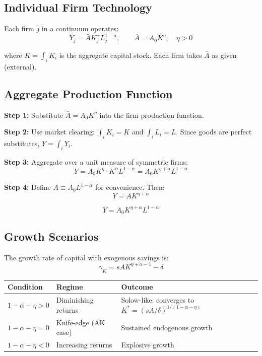 \documentclass[a4paper,11pt]{article}
\begin{document}
\subsection*{Individual Firm Technology}

Each firm $j$ in a continuum operates:
\[
Y_j = \bar{A} K_j^\alpha L_j^{1-\alpha}, \qquad \bar{A} = A_0 K^\eta, \quad \eta > 0
\]

where $K = \int_i K_i$ is the aggregate capital stock. Each firm takes $\bar{A}$ as given (external).

\subsection*{Aggregate Production Function}

\begin{derivationbox}
\textbf{Step 1:} Substitute $\bar{A} = A_0 K^\eta$ into the firm production function.

\textbf{Step 2:} Use market clearing: $\int_i K_i = K$ and $\int_i L_i = L$. Since goods are perfect substitutes, $Y = \int_i Y_i$.

\textbf{Step 3:} Aggregate over a unit measure of symmetric firms:
\[
Y = A_0 K^\eta \cdot K^\alpha L^{1-\alpha} = A_0 K^{\eta+\alpha} L^{1-\alpha}
\]

\textbf{Step 4:} Define $A \equiv A_0 L^{1-\alpha}$ for convenience. Then:
\[
Y = A K^{\eta + \alpha}
\]
\end{derivationbox}

\begin{resultbox}
\[
\boxed{Y = A_0 K^{\eta+\alpha} L^{1-\alpha}}
\tag{Aggregate Arrow-Frankel}
\]
\end{resultbox}

\subsection*{Growth Scenarios}

The growth rate of capital with exogenous savings is:
\[
\gamma_K = sA K^{\eta + \alpha - 1} - \delta
\]

\begin{center}
\begin{tabular}{lll}
\toprule
Condition & Regime & Outcome \\
\midrule
$1 - \alpha - \eta > 0$ & Diminishing returns & Solow-like: converges to $K^* = (sA/\delta)^{1/(1-\alpha-\eta)}$ \\
$1 - \alpha - \eta = 0$ & Knife-edge (AK case) & Sustained endogenous growth \\
$1 - \alpha - \eta < 0$ & Increasing returns & Explosive growth \\
\bottomrule
\end{tabular}
\end{center}
\end{document}
